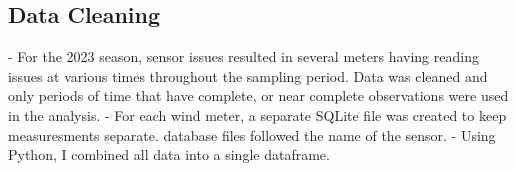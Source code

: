 \subsection{Data Cleaning}
- For the 2023 season, sensor issues resulted in several meters having reading issues at various times throughout the sampling period. Data was cleaned and only periods of time that have complete, or near complete observations were used in the analysis.
- For each wind meter, a separate SQLite file was created to keep measuresments separate. database files followed the name of the sensor. 
- Using Python, I combined all data into a single dataframe.


